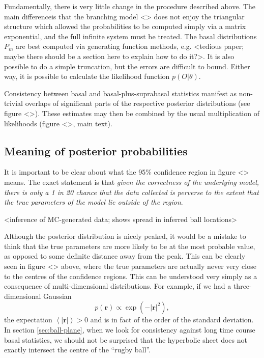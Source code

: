 \documentclass[10pt,UKenglish]{article}
\begin{document}
Fundamentally, there is very little change in the procedure described above. The main differenceis that the branching model <> does not enjoy the triangular structure which allowed the probabilities to be computed simply via a matrix exponential, and the full infinite system must be treated. The basal distributions $P_m$ are best computed via generating function methods, e.g. <tedious paper; maybe there should be a section here to explain how to do it?>. It is also possible to do a simple truncation, but the errors are difficult to bound. Either way, it is possible to calculate the likelihood function $p(O|\theta)$.

Consistency between basal and basal-plus-suprabasal statistics manifest as non-trivial overlaps of significant parts of the respective posterior distributions (see figure <>). These estimates may then be combined by the usual multiplication of likelihoods (figure <>, main text).

\subsection{Meaning of posterior probabilities}

It is important to be clear about what the 95\% confidence region in figure <> means. The exact statement is that \emph{given the correctness of the underlying model, there is only a 1 in 20 chance that the data collected is perverse to the extent that the true parameters of the model lie outside of the region}.

<inference of MC-generated data; shows spread in inferred ball locations>

Although the posterior distribution is nicely peaked, it would be a mistake to think that the true parameters are more likely to be at the most probable value, as opposed to some definite distance away from the peak. This can be clearly seen in figure <> above, where the true parameters are actually never very close to the centres of the confidence regions. This can be understood very simply as a consequence of multi-dimensional distributions. For example, if we had a three-dimensional Gaussian $$p(\mathbf{r}) \propto \exp\left(-|\mathbf r|^2\right),$$ the expectation $\left\langle \mathbf |\mathbf r| \right\rangle > 0$ and is in fact of the order of the standard deviation. In section \ref{sec:ball-plane}, when we look for consistency against long time course basal statistics, we should not be surprised that the hyperbolic sheet does not exactly intersect the centre of the ``rugby ball''.
\end{document}

